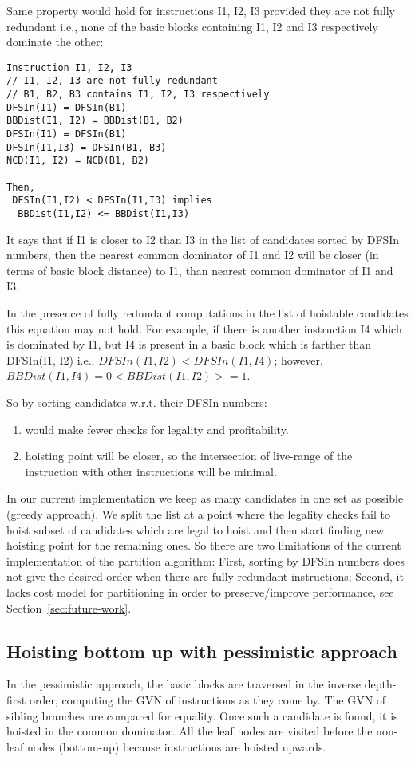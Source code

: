 \documentclass{sig-alternate}
\begin{document}
Same property would hold for instructions I1, I2, I3 provided they are not fully
redundant i.e., none of the basic blocks containing I1, I2 and I3 respectively
dominate the other:

\begin{verbatim}
Instruction I1, I2, I3
// I1, I2, I3 are not fully redundant
// B1, B2, B3 contains I1, I2, I3 respectively
DFSIn(I1) = DFSIn(B1)
BBDist(I1, I2) = BBDist(B1, B2)
DFSIn(I1) = DFSIn(B1)
DFSIn(I1,I3) = DFSIn(B1, B3)
NCD(I1, I2) = NCD(B1, B2)

Then,
 DFSIn(I1,I2) < DFSIn(I1,I3) implies
  BBDist(I1,I2) <= BBDist(I1,I3)
\end{verbatim}

It says that if I1 is closer to I2 than I3 in the list of candidates sorted by
DFSIn numbers, then the nearest common dominator of I1 and I2 will be closer (in
terms of basic block distance) to I1, than nearest common dominator of I1 and
I3.

In the presence of fully redundant computations in the list of hoistable
candidates this equation may not hold. For example, if there is another
instruction I4 which is dominated by I1, but I4 is present in a basic block
which is farther than DFSIn(I1, I2) i.e., $DFSIn(I1,I2) < DFSIn(I1,I4)$;
however, $BBDist(I1,I4) = 0 < BBDist(I1,I2) >=1$.

So by sorting candidates w.r.t. their DFSIn numbers:
\begin{enumerate}
\item would make fewer checks for legality and profitability.
\item hoisting point will be closer, so the intersection of live-range of the
  instruction with other instructions will be minimal.
\end{enumerate}

In our current implementation we keep as many candidates in one set as possible
(greedy approach). We split the list at a point where the legality checks fail
to hoist subset of candidates which are legal to hoist and then start finding
new hoisting point for the remaining ones. So there are two limitations of the
current implementation of the partition algorithm: First, sorting by DFSIn
numbers does not give the desired order when there are fully redundant
instructions; Second, it lacks cost model for partitioning in order to
preserve/improve performance, see Section~\ref{sec:future-work}.

\subsection{Hoisting bottom up with pessimistic approach}
\label{subsec:pessimistic}
In the pessimistic approach, the basic blocks are traversed in the inverse
depth-first order, computing the GVN of instructions as they come by. The GVN of
sibling branches are compared for equality. Once such a candidate is found, it
is hoisted in the common dominator. All the leaf nodes are visited before the
non-leaf nodes (bottom-up) because instructions are hoisted upwards.
\end{document}
